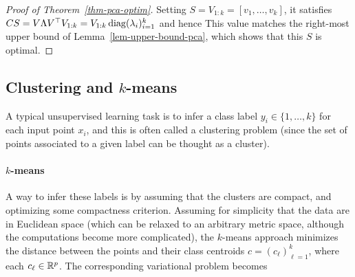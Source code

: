 \begin{proof}[Proof of Theorem~\ref{thm-pca-optim}]
	Setting $S=V_{1:k}=[v_1,\ldots,v_k]$, it satisfies $CS = V \Lambda V^\top V_{1:k} = V_{1:k} \operatorname{diag}(\lambda_i)_{i=1}^k$ and hence
	This value matches the right-most upper bound of Lemma~\ref{lem-upper-bound-pca}, which shows that this $S$ is optimal.
\end{proof}



 
 

\subsection{Clustering and $k$-means}

A typical unsupervised learning task is to infer a class label $y_i \in \{1,\ldots,k\}$ for each input point $x_i$, and this is often called a clustering problem (since the set of points associated to a given label can be thought as a cluster).

\paragraph{$k$-means}

A way to infer these labels is by assuming that the clusters are compact, and optimizing some compactness criterion. Assuming for simplicity that the data are in Euclidean space (which can be relaxed to an arbitrary metric space, although the computations become more complicated), the $k$-means approach minimizes the distance between the points and their class centroids $c=(c_\ell)_{\ell=1}^k$, where each $c_\ell \in \mathbb{R}^p$. The corresponding variational problem becomes

